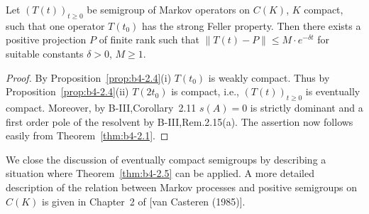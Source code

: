 \begin{theorem}\label{thm:b4-2.5}
	Let $(T(t))_{t \geq 0}$ be semigroup of Markov operators on
	$C(K)$, $K$ compact, such that one operator $T(t_{0})$ has the strong Feller
	property.
	Then there exists a positive projection $P$ of finite rank
	such that $\|T(t) - P\| \leq M\cdot e^{-\delta t}$ for suitable constants $\delta>0$, $M \geq 1$.
\end{theorem}

\begin{proof}
	By Proposition~\ref{prop:b4-2.4}(i) $T(t_{0})$ is weakly compact.
	Thus by Proposition~\ref{prop:b4-2.4}(ii)
	$T(2t_{0})$ is compact, i.e., $(T(t))_{t \geq 0}$ is eventually compact.
	Moreover,
	by B-III,Corollary~2.11 $s(A) = 0$ is strictly dominant and a first order
	pole of the resolvent by B-III,Rem.2.15(a).
	The assertion now follows
	easily from Theorem~\ref{thm:b4-2.1}.
\end{proof}

We close the discussion of eventually compact semigroups by describing
a situation where Theorem~\ref{thm:b4-2.5} can be applied.
A more detailed description
of the relation between Markov processes and positive semigroups on
$C(K)$ is given in Chapter~2 of [van Casteren (1985)].

